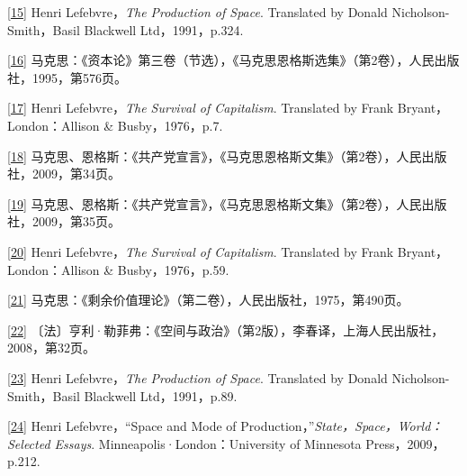 \documentclass[UTF8, fontset = sourcesans, a4paper, oneside, zihao =
-4, scheme=chinese, no-math, space=true]{ctexbook}
\begin{document}
\protect\hypertarget{part0007_split_004.htmlux5cux23m15}{}{}\protect\hyperlink{part0007_split_001.htmlux5cux23w15}{{[}15{]}}
Henri Lefebvre，\emph{The Production of Space}. Translated by Donald
Nicholson-Smith，Basil Blackwell Ltd，1991，p.324.

\protect\hypertarget{part0007_split_004.htmlux5cux23m16}{}{}\protect\hyperlink{part0007_split_001.htmlux5cux23w16}{{[}16{]}}
马克思：《资本论》第三卷（节选），《马克思恩格斯选集》（第2卷），人民出版社，1995，第576页。

\protect\hypertarget{part0007_split_004.htmlux5cux23m17}{}{}\protect\hyperlink{part0007_split_001.htmlux5cux23w17}{{[}17{]}}
Henri Lefebvre，\emph{The Survival of Capitalism}. Translated by Frank
Bryant，London：Allison \& Busby，1976，p.7.

\protect\hypertarget{part0007_split_004.htmlux5cux23m18}{}{}\protect\hyperlink{part0007_split_001.htmlux5cux23w18}{{[}18{]}}
马克思、恩格斯：《共产党宣言》，《马克思恩格斯文集》（第2卷），人民出版社，2009，第34页。

\protect\hypertarget{part0007_split_004.htmlux5cux23m19}{}{}\protect\hyperlink{part0007_split_001.htmlux5cux23w19}{{[}19{]}}
马克思、恩格斯：《共产党宣言》，《马克思恩格斯文集》（第2卷），人民出版社，2009，第35页。

\protect\hypertarget{part0007_split_004.htmlux5cux23m20}{}{}\protect\hyperlink{part0007_split_001.htmlux5cux23w20}{{[}20{]}}
Henri Lefebvre，\emph{The Survival of Capitalism}. Translated by Frank
Bryant，London：Allison \& Busby，1976，p.59.

\protect\hypertarget{part0007_split_004.htmlux5cux23m21}{}{}\protect\hyperlink{part0007_split_001.htmlux5cux23w21}{{[}21{]}}
马克思：《剩余价值理论》（第二卷），人民出版社，1975，第490页。

\protect\hypertarget{part0007_split_004.htmlux5cux23m22}{}{}\protect\hyperlink{part0007_split_001.htmlux5cux23w22}{{[}22{]}}
〔法〕亨利·勒菲弗：《空间与政治》（第2版），李春译，上海人民出版社，2008，第32页。

\protect\hypertarget{part0007_split_004.htmlux5cux23m23}{}{}\protect\hyperlink{part0007_split_001.htmlux5cux23w23}{{[}23{]}}
Henri Lefebvre，\emph{The Production of Space}. Translated by Donald
Nicholson-Smith，Basil Blackwell Ltd，1991，p.89.

\protect\hypertarget{part0007_split_004.htmlux5cux23m24}{}{}\protect\hyperlink{part0007_split_001.htmlux5cux23w24}{{[}24{]}}
Henri Lefebvre，``Space and Mode of
Production，''\emph{State，Space，World：Selected Essays}.
Minneapolis·London：University of Minnesota Press，2009，p.212.
\end{document}
